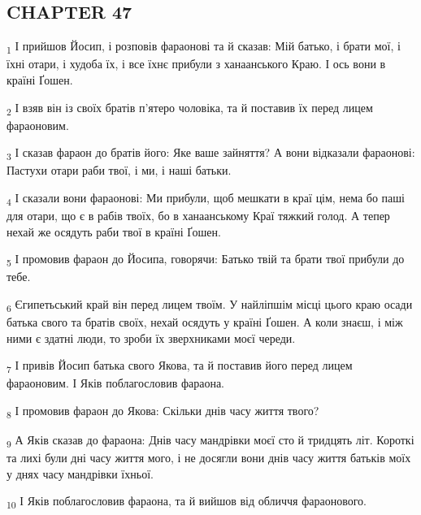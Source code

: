 \subsection{CHAPTER 47}
\begin{tcolorbox}
\textsubscript{1} І прийшов Йосип, і розповів фараонові та й сказав: Мій батько, і брати мої, і їхні отари, і худоба їх, і все їхнє прибули з ханаанського Краю. І ось вони в країні Ґошен.
\end{tcolorbox}
\begin{tcolorbox}
\textsubscript{2} І взяв він із своїх братів п'ятеро чоловіка, та й поставив їх перед лицем фараоновим.
\end{tcolorbox}
\begin{tcolorbox}
\textsubscript{3} І сказав фараон до братів його: Яке ваше зайняття? А вони відказали фараонові: Пастухи отари раби твої, і ми, і наші батьки.
\end{tcolorbox}
\begin{tcolorbox}
\textsubscript{4} І сказали вони фараонові: Ми прибули, щоб мешкати в краї цім, нема бо паші для отари, що є в рабів твоїх, бо в ханаанському Краї тяжкий голод. А тепер нехай же осядуть раби твої в країні Ґошен.
\end{tcolorbox}
\begin{tcolorbox}
\textsubscript{5} І промовив фараон до Йосипа, говорячи: Батько твій та брати твої прибули до тебе.
\end{tcolorbox}
\begin{tcolorbox}
\textsubscript{6} Єгипетьський край він перед лицем твоїм. У найліпшім місці цього краю осади батька свого та братів своїх, нехай осядуть у країні Ґошен. А коли знаєш, і між ними є здатні люди, то зроби їх зверхниками моєї череди.
\end{tcolorbox}
\begin{tcolorbox}
\textsubscript{7} І привів Йосип батька свого Якова, та й поставив його перед лицем фараоновим. І Яків поблагословив фараона.
\end{tcolorbox}
\begin{tcolorbox}
\textsubscript{8} І промовив фараон до Якова: Скільки днів часу життя твого?
\end{tcolorbox}
\begin{tcolorbox}
\textsubscript{9} А Яків сказав до фараона: Днів часу мандрівки моєї сто й тридцять літ. Короткі та лихі були дні часу життя мого, і не досягли вони днів часу життя батьків моїх у днях часу мандрівки їхньої.
\end{tcolorbox}
\begin{tcolorbox}
\textsubscript{10} І Яків поблагословив фараона, та й вийшов від обличчя фараонового.
\end{tcolorbox}

